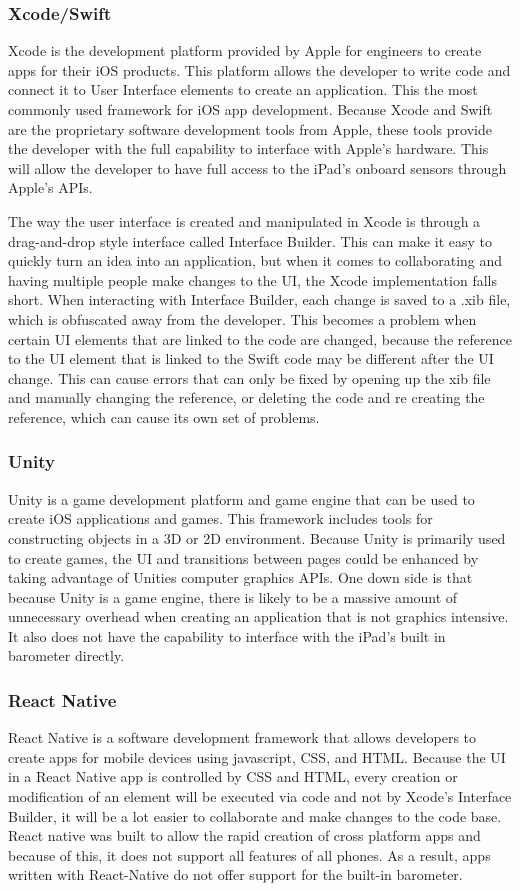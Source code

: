 \documentclass[onecolumn, draftclsnofoot,10pt, compsoc]{IEEEtran}
\begin{document}
\subsubsection{Xcode/Swift}
Xcode is the development platform provided by Apple for engineers to create apps for their iOS products.
This platform allows the developer to write code and connect it to User Interface elements to create an application. This the most commonly used framework for iOS app development.
Because Xcode and Swift are the proprietary software development tools from Apple, these tools provide the developer with the full capability to interface with Apple's hardware.
This will allow the developer to have full access to the iPad's onboard sensors through Apple's APIs.

The way the user interface is created and manipulated in Xcode is through a drag-and-drop style interface called Interface Builder.
This can make it easy to quickly turn an idea into an application, but when it comes to collaborating and having multiple people make changes to the UI, the Xcode implementation falls short.
When interacting with Interface Builder, each change is saved to a .xib file, which is obfuscated away from the developer.
This becomes a problem when certain UI elements that are linked to the code are changed, because the reference to the UI element that is linked to the Swift code may be different after the UI change.
This can cause errors that can only be fixed by opening up the xib file and manually changing the reference, or deleting the code and re creating the reference, which can cause its own set of problems.

\subsubsection{Unity}
Unity is a game development platform and game engine that can be used to create iOS applications and games.
This framework includes tools for constructing objects in a 3D or 2D environment.
Because Unity is primarily used to create games, the UI and transitions between pages could be enhanced by taking advantage of Unities computer graphics APIs.
One down side is that because Unity is a game engine, there is likely to be a massive amount of unnecessary overhead when creating an application that is not graphics intensive.
It also does not have the capability to interface with the iPad's built in barometer directly.

\subsubsection{React Native}
React Native is a software development framework that allows developers to create apps for mobile devices using javascript, CSS, and HTML.
Because the UI in a React Native app is controlled by CSS and HTML, every creation or modification of an element will be executed via code and not by Xcode's Interface Builder, it will be a lot easier to collaborate and make changes to the code base.
React native was built to allow the rapid creation of cross platform apps and because of this, it does not support all features of all phones.
As a result, apps written with React-Native do not offer support for the built-in barometer.
\end{document}
